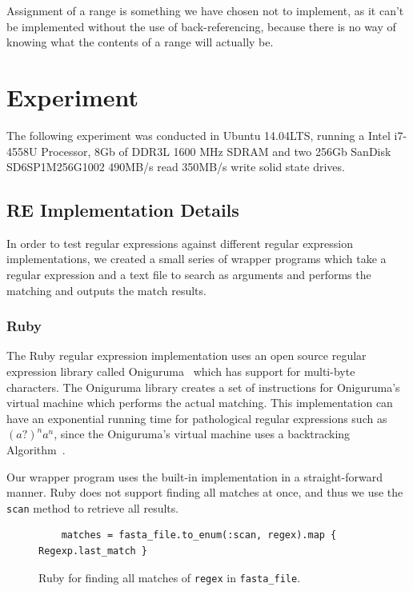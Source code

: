 \documentclass[12pt]{article}
\theoremstyle{definition}
\begin{document}
Assignment of a range is something we have chosen not to implement, as it can't be implemented without the use of back-referencing, because there is no way of knowing what the contents of a range will actually be.

\section{Experiment}

The following experiment was conducted in Ubuntu 14.04LTS, running a Intel i7-4558U Processor, 8Gb of DDR3L 1600 MHz SDRAM and two 256Gb SanDisk SD6SP1M256G1002 490MB/s read 350MB/s write solid state drives.

\subsection{RE Implementation Details}

In order to test regular expressions against different regular expression implementations, we created a small series of wrapper programs which take a regular expression and a text file to search as arguments and performs the matching and outputs the match results.

\subsubsection{Ruby}

The Ruby regular expression implementation uses an open source regular expression library called Oniguruma~\cite{oniguruma} which has support for multi-byte characters. The Oniguruma library creates a set of instructions for Oniguruma's virtual machine which performs the actual matching. This implementation can have an exponential running time for pathological regular expressions such as $(a?)^na^n$, since the Oniguruma's virtual machine uses a backtracking Algorithm~\cite{oniguruma-overview}.

Our wrapper program uses the built-in implementation in a straight-forward manner. Ruby does not support finding all matches at once, and thus we use the \texttt{scan} method to retrieve all results.

\begin{figure}[H]
	\begin{lstlisting}
	matches = fasta_file.to_enum(:scan, regex).map { Regexp.last_match }
	\end{lstlisting}
	\caption{Ruby for finding all matches of \texttt{regex} in \texttt{fasta\_file}.}
\end{figure}
\end{document}
